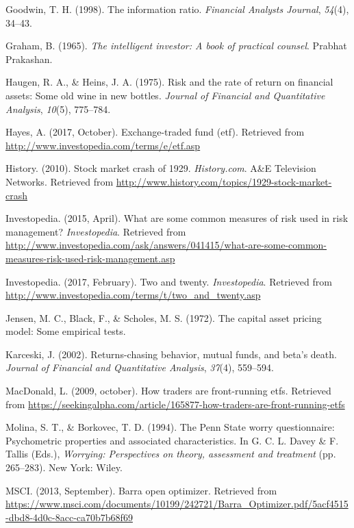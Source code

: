 \documentclass[12pt,twoside]{reedthesis}
\theoremstyle{definition}
\theoremstyle{definition}
\theoremstyle{definition}
\theoremstyle{remark}
\begin{document}
\hypertarget{ref-goodwin1998}{}
Goodwin, T. H. (1998). The information ratio. \emph{Financial Analysts
Journal}, \emph{54}(4), 34--43.

\hypertarget{ref-graham1965}{}
Graham, B. (1965). \emph{The intelligent investor: A book of practical
counsel}. Prabhat Prakashan.

\hypertarget{ref-haugen1975}{}
Haugen, R. A., \& Heins, J. A. (1975). Risk and the rate of return on
financial assets: Some old wine in new bottles. \emph{Journal of
Financial and Quantitative Analysis}, \emph{10}(5), 775--784.

\hypertarget{ref-hayes2017}{}
Hayes, A. (2017, October). Exchange-traded fund (etf). Retrieved from
\url{http://www.investopedia.com/terms/e/etf.asp}

\hypertarget{ref-history2010}{}
History. (2010). Stock market crash of 1929. \emph{History.com}. A\&E
Television Networks. Retrieved from
\url{http://www.history.com/topics/1929-stock-market-crash}

\hypertarget{ref-investopedia2015}{}
Investopedia. (2015, April). What are some common measures of risk used
in risk management? \emph{Investopedia}. Retrieved from
\url{http://www.investopedia.com/ask/answers/041415/what-are-some-common-measures-risk-used-risk-management.asp}

\hypertarget{ref-investopedia2017}{}
Investopedia. (2017, February). Two and twenty. \emph{Investopedia}.
Retrieved from
\url{http://www.investopedia.com/terms/t/two_and_twenty.asp}

\hypertarget{ref-jensen1972}{}
Jensen, M. C., Black, F., \& Scholes, M. S. (1972). The capital asset
pricing model: Some empirical tests.

\hypertarget{ref-karceski2002}{}
Karceski, J. (2002). Returns-chasing behavior, mutual funds, and beta's
death. \emph{Journal of Financial and Quantitative Analysis},
\emph{37}(4), 559--594.

\hypertarget{ref-macdonald2009}{}
MacDonald, L. (2009, october). How traders are front-running etfs.
Retrieved from
\url{https://seekingalpha.com/article/165877-how-traders-are-front-running-etfs}

\hypertarget{ref-Molina1994}{}
Molina, S. T., \& Borkovec, T. D. (1994). The Penn State worry
questionnaire: Psychometric properties and associated characteristics.
In G. C. L. Davey \& F. Tallis (Eds.), \emph{Worrying: Perspectives on
theory, assessment and treatment} (pp. 265--283). New York: Wiley.

\hypertarget{ref-msci2013}{}
MSCI. (2013, September). Barra open optimizer. Retrieved from
\url{https://www.msci.com/documents/10199/242721/Barra_Optimizer.pdf/5acf4515-dbd8-4d0c-8acc-ca70b7b68f69}
\end{document}
